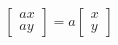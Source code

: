 \documentclass[preview]{standalone}
\begin{document}
\begin{align*}
\begin{bmatrix} ax \\ ay \end{bmatrix} = a\begin{bmatrix} x \\ y \end{bmatrix}
\end{align*}
\end{document}
